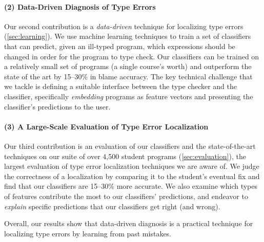 \paragraph{\textbf{(2) Data-Driven Diagnosis of Type Errors}}
Our second contribution is a \emph{data-driven} technique for localizing
type errors (\autoref{sec:learning}).
%
We use machine learning techniques to train a set of classifiers that can
predict, given an ill-typed program, which expressions should be changed
in order for the program to type check.
%
Our classifiers can be trained on a relatively small set of programs
(\ie a single course's worth) and outperform the state of the art by
15--30\% in blame accuracy.
%
The key technical challenge that we tackle is defining a suitable
interface between the type checker and the classifier, specifically
\emph{embedding} programs as feature vectors and presenting the
classifier's predictions to the user.

\paragraph{\textbf{(3) A Large-Scale Evaluation of Type Error Localization}}
Our third contribution is an evaluation of our classifiers and the
state-of-the-art techniques on our suite of over 4,500 student programs
(\autoref{sec:evaluation}), the largest evaluation of type error
localization techniques we are aware of.
%
We judge the correctness of a localization by comparing it to the
student's eventual fix and find that our classifiers are 15--30\% more
accurate.
%
We also examine which types of features contribute the most to our
classifiers' predictions, and endeavor to \emph{explain} specific
predictions that our classifiers get right (and wrong).

Overall, our results show that data-driven diagnosis is a practical
technique for localizing type errors by learning from past mistakes.
%

